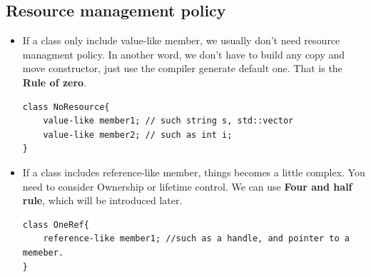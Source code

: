 \documentclass[a4paper,11pt,twoside]{book}
\begin{document}
\subsection{Resource management policy}
\begin{itemize}
    \item If a class only include value-like member, we usually don't need resource managment policy. In another word, 
we don't have to build any copy and move constructor, just use the compiler generate default one. That is the \textbf{Rule of zero}.
\begin{lstlisting}
class NoResource{
	value-like member1; // such string s, std::vector
	value-like member2; // such as int i;
}
\end{lstlisting}

    \item If a class includes reference-like member, things becomes a little complex. You need to consider Ownership or lifetime control. We can use \textbf{Four and half rule}, which will be introduced later.

\begin{lstlisting}
class OneRef{
	reference-like member1; //such as a handle, and pointer to a memeber.
}
\end{lstlisting}

\end{itemize}
\end{document}
